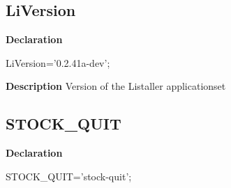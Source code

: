 \documentclass{report}
\newif\ifpdf
\begin{document}
\subsection*{LiVersion}
\fi
\label{licommon-LiVersion}
\begin{list}{}{
\setlength{\itemindent}{0cm}
\setlength{\listparindent}{0cm}
\setlength{\leftmargin}{\evensidemargin}
\addtolength{\leftmargin}{\tmplength}
\settowidth{\labelsep}{X}
\addtolength{\leftmargin}{\labelsep}
\setlength{\labelwidth}{\tmplength}
}
\item[\textbf{Declaration}\hfill]
\ifpdf
\begin{flushleft}
\fi
\begin{ttfamily}
LiVersion='0.2.41a-dev';\end{ttfamily}

\ifpdf
\end{flushleft}
\fi

\par
\item[\textbf{Description}]
Version of the Listaller applicationset

\end{list}
\ifpdf
\subsection*{\large{\textbf{STOCK{\_}QUIT}}\normalsize\hspace{1ex}\hrulefill}
\else
\subsection*{STOCK{\_}QUIT}
\fi
\label{licommon-STOCK_QUIT}
\begin{list}{}{
\setlength{\itemindent}{0cm}
\setlength{\listparindent}{0cm}
\setlength{\leftmargin}{\evensidemargin}
\addtolength{\leftmargin}{\tmplength}
\settowidth{\labelsep}{X}
\addtolength{\leftmargin}{\labelsep}
\setlength{\labelwidth}{\tmplength}
}
\item[\textbf{Declaration}\hfill]
\ifpdf
\begin{flushleft}
\fi
\begin{ttfamily}
STOCK{\_}QUIT='stock-quit';\end{ttfamily}

\ifpdf
\end{flushleft}
\fi

\end{list}
\ifpdf
\end{document}
